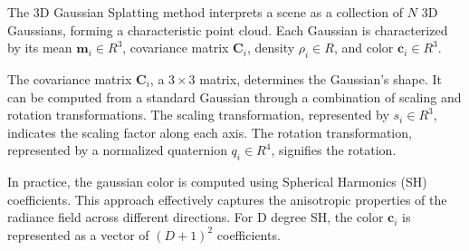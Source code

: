 The 3D Gaussian Splatting method interprets a scene 
as a collection of $N$ 3D Gaussians, forming a characteristic point cloud. 
Each Gaussian is characterized by its mean $\mathbf{m}_i \in R^3$, 
covariance matrix $\mathbf{C}_i$, density $\rho_i\in R$, and color $\mathbf{c}_i\in R^3$.

The covariance matrix $\mathbf{C}_i$, a $3\times 3$ matrix, 
determines the Gaussian's shape. 
It can be computed from a standard Gaussian through a combination of scaling and rotation transformations. 
The scaling transformation, represented by $s_i\in R^3$, indicates the scaling factor along each axis. 
The rotation transformation, represented by a normalized quaternion $q_i\in R^4$, signifies the rotation.

In practice, the gaussian color is computed using Spherical Harmonics (SH) coefficients. 
This approach effectively captures the anisotropic properties of the radiance field across different directions.
For D degree SH, the color $\mathbf{c}_i$ is represented as a vector of $(D+1)^2$ coefficients.